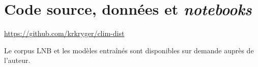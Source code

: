 \documentclass[a4paper,twoside,12pt]{article}
\begin{document}
\clearpage


\section*{Code source, données et \textit{notebooks}}

\noindent \url{https://github.com/krkryger/clim-dist}

\medskip

\noindent Le corpus LNB et les modèles entraînés sont disponibles sur demande auprès de l'auteur.








\printbibliography
{}
\clearpage

\listoffigures
\clearpage

\tableofcontents
\clearpage
\end{document}
